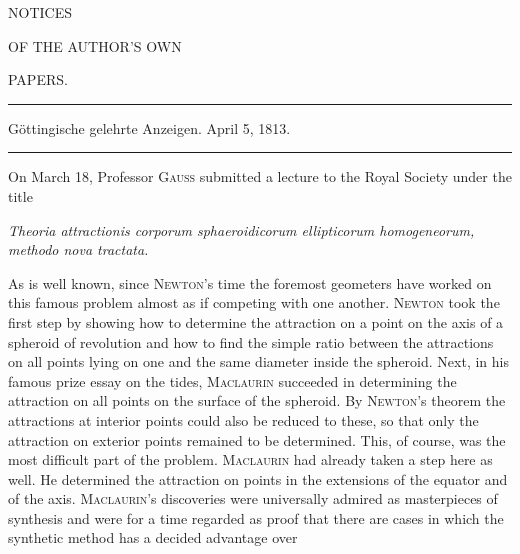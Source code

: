 \clearpage
\thispagestyle{empty}
\begin{center}
\vspace*{2in}
{\Large NOTICES\par}
\vspace{0.5in}
OF THE AUTHOR'S OWN\par
\vspace{0.5in}
{\Large PAPERS.\par}
\end{center}
\clearpage
{}
\begin{center}
\rule{0.85\textwidth}{0.3pt}\par
Göttingische gelehrte Anzeigen. April 5, 1813.\par
\rule{0.85\textwidth}{0.3pt}
\end{center}
\medskip
On March 18, Professor \textsc{Gauss} submitted a lecture to the Royal Society under the title
\begin{center}
\textit{Theoria attractionis corporum sphaeroidicorum ellipticorum homogeneorum, methodo nova tractata.}
\end{center}
As is well known, since \textsc{Newton}'s time the foremost geometers have worked on this famous problem almost as if competing with one another. \textsc{Newton} took the first step by showing how to determine the attraction on a point on the axis of a spheroid of revolution and how to find the simple ratio between the attractions on all points lying on one and the same diameter inside the spheroid. Next, in his famous prize essay on the tides, \textsc{Maclaurin} succeeded in determining the attraction on all points on the surface of the spheroid. By \textsc{Newton}'s theorem the attractions at interior points could also be reduced to these, so that only the attraction on exterior points remained to be determined. This, of course, was the most difficult part of the problem. \textsc{Maclaurin} had already taken a step here as well. He determined the attraction on points in the extensions of the equator and of the axis. \textsc{Maclaurin}'s discoveries were universally admired as masterpieces of synthesis and were for a time regarded as proof that there are cases in which the synthetic method has a decided advantage over

